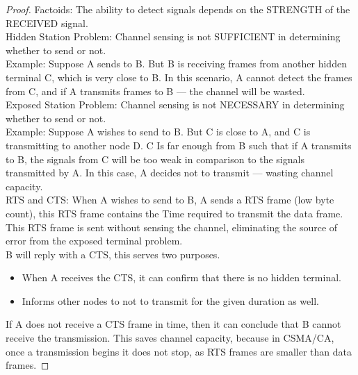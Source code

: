 \documentclass[../main.tex]{subfiles}
\begin{document}
\begin{proof}
Factoids: The ability to detect signals depends on the STRENGTH of the RECEIVED signal.\\

Hidden Station Problem: Channel sensing is not SUFFICIENT in determining whether to send or not.\\

Example: Suppose A sends to B. But B is receiving frames from another hidden terminal C, which is very close to B. In this scenario, A cannot detect the frames from C, and if A transmits frames to B — the channel will be wasted.\\

Exposed Station Problem: Channel sensing is not NECESSARY in determining whether to send or not.\\

Example: Suppose A wishes to send to B. But C is close to A, and C is transmitting to another node D. C Is far enough from B such that if A transmits to B, the signals from C will be too weak in comparison to the signals transmitted by A. In this case, A decides not to transmit — wasting channel capacity.\\

RTS and CTS: When A wishes to send to B, A sends a RTS frame (low byte count), this RTS frame contains the Time required to transmit the data frame.\\

This RTS frame is sent without sensing the channel, eliminating the source of error from the exposed terminal problem.\\

B will reply with a CTS, this serves two purposes.
\begin{itemize}
\item When A receives the CTS, it can confirm that there is no hidden terminal.
\item Informs other nodes to not to transmit for the given duration as well.
\end{itemize}

If A does not receive a CTS frame in time, then it can conclude that B cannot receive the transmission. This saves channel capacity, because in CSMA/CA, once a transmission begins it does not stop, as RTS frames are smaller than data frames.
\end{proof}\newpage
\end{document}
